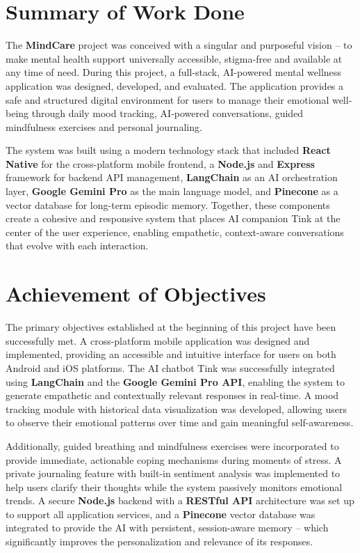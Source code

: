 \documentclass[a4paper,12pt]{report}
\begin{document}
\section{Summary of Work Done}
The \textbf{MindCare} project was conceived with a singular and purposeful vision -- to make mental health support universally accessible, stigma-free and available at any time of need. During this project, a full-stack, AI-powered mental wellness application was designed, developed, and evaluated. The application provides a safe and structured digital environment for users to manage their emotional well-being through daily mood tracking, AI-powered conversations, guided mindfulness exercises and personal journaling.

The system was built using a modern technology stack that included \textbf{React Native} for the cross-platform mobile frontend, a \textbf{Node.js} and \textbf{Express} framework for backend API management, \textbf{LangChain} as an AI orchestration layer, \textbf{Google Gemini Pro} as the main language model, and \textbf{Pinecone} as a vector database for long-term episodic memory. Together, these components create a cohesive and responsive system that places AI companion Tink at the center of the user experience, enabling empathetic, context-aware conversations that evolve with each interaction.

\section{Achievement of Objectives}
The primary objectives established at the beginning of this project have been successfully met. A cross-platform mobile application was designed and implemented, providing an accessible and intuitive interface for users on both Android and iOS platforms. The AI chatbot Tink was successfully integrated using \textbf{LangChain} and the \textbf{Google Gemini Pro API}, enabling the system to generate empathetic and contextually relevant responses in real-time. A mood tracking module with historical data visualization was developed, allowing users to observe their emotional patterns over time and gain meaningful self-awareness.

Additionally, guided breathing and mindfulness exercises were incorporated to provide immediate, actionable coping mechanisms during moments of stress. A private journaling feature with built-in sentiment analysis was implemented to help users clarify their thoughts while the system passively monitors emotional trends. A secure \textbf{Node.js} backend with a \textbf{RESTful API} architecture was set up to support all application services, and a \textbf{Pinecone} vector database was integrated to provide the AI with persistent, session-aware memory -- which significantly improves the personalization and relevance of its responses.
\end{document}
